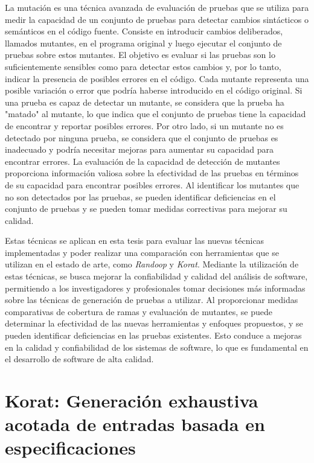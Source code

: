 La mutación es una técnica avanzada de evaluación de pruebas que se utiliza para medir la capacidad de un conjunto de pruebas para detectar cambios sintácticos o semánticos en el código fuente. Consiste en introducir cambios deliberados, llamados mutantes, en el programa original y luego ejecutar el conjunto de pruebas sobre estos mutantes. El objetivo es evaluar si las pruebas son lo suficientemente sensibles como para detectar estos cambios y, por lo tanto, indicar la presencia de posibles errores en el código.
Cada mutante representa una posible variación o error que podría haberse introducido en el código original. Si una prueba es capaz de detectar un mutante, se considera que la prueba ha "matado" al mutante, lo que indica que el conjunto de pruebas tiene la capacidad de encontrar y reportar posibles errores. Por otro lado, si un mutante no es detectado por ninguna prueba, se considera que el conjunto de pruebas es inadecuado y podría necesitar mejoras para aumentar su capacidad para encontrar errores.
La evaluación de la capacidad de detección de mutantes proporciona información valiosa sobre la efectividad de las pruebas en términos de su capacidad para encontrar posibles errores. Al identificar los mutantes que no son detectados por las pruebas, se pueden identificar deficiencias en el conjunto de pruebas y se pueden tomar medidas correctivas para mejorar su calidad.

Estas técnicas se aplican en esta tesis para evaluar las nuevas técnicas implementadas y poder realizar una comparación con herramientas que se utilizan en el estado de arte, como \emph{Randoop} y \emph{Korat}. Mediante la utilización de estas técnicas, se busca mejorar la confiabilidad y calidad del análisis de software, permitiendo a los investigadores y profesionales tomar decisiones más informadas sobre las técnicas de generación de pruebas a utilizar. Al proporcionar medidas comparativas de cobertura de ramas y evaluación de mutantes, se puede determinar la efectividad de las nuevas herramientas y enfoques propuestos, y se pueden identificar deficiencias en las pruebas existentes. Esto conduce a mejoras en la calidad y confiabilidad de los sistemas de software, lo que es fundamental en el desarrollo de software de alta calidad.



\section{Korat: Generación exhaustiva acotada de entradas basada en especificaciones}
\label{sec:korat}

